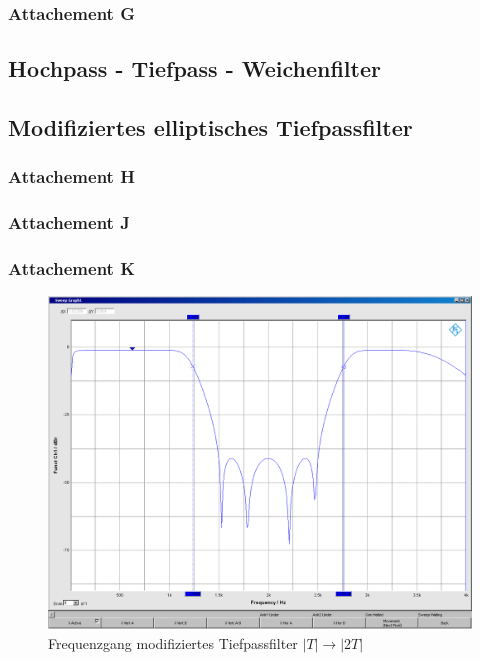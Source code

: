 \subsubsection{Attachement G}


\subsection{Hochpass - Tiefpass - Weichenfilter}


\subsection{Modifiziertes elliptisches Tiefpassfilter}
\subsubsection{Attachement H}


\subsubsection{Attachement J}


\subsubsection{Attachement K}

	\begin{figure}[h]
		\centering
		\includegraphics[width=0.7\linewidth]{Bilder/ellip2T}
		\caption{Frequenzgang modifiziertes Tiefpassfilter $|T| \rightarrow |2T|$}
		\label{fig:ellip2T}
	\end{figure}
